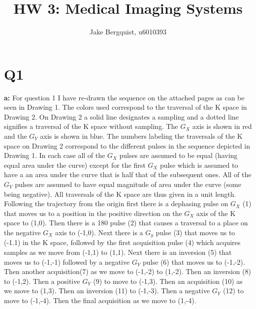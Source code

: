 \documentclass[12pt]{article}
\begin{document}
\title{HW 3: Medical Imaging Systems}
\author{Jake Bergquist, u6010393 }
\maketitle

\section{Q1}
\noindent\textbf{a: }
For question 1 I have re-drawn the sequence on the attached pages as can be seen in Drawing 1.  The colors used correspond to the traversal of the K space in Drawing 2. On Drawing 2 a solid line designates a sampling and a dotted line signifies a traversal of the K space without sampling. The $G_X$ axis is shown in red and the $G_Y$ axis is shown in blue. The numbers labeling the traversals of the K space on Drawing 2 correspond to the different pulses in the sequence depicted in Drawing 1. In each case all of the $G_X$ pulses are assumed to be equal (having equal area under the curve) except for the first $G_X$ pulse which is assumed to have a an area under the curve that is half that of the subsequent ones. All of the $G_Y$ pulses are assumed to have equal magnitude of area under the curve (some being negative). All traversals of the K space are thus given in a unit length. Following the trajectory from the origin first there is a dephasing pulse on $G_X$ (1) that moves us to a position in the positive direction on the $G_X$ axis of the K space to (1,0). Then there is a 180 pulse (2) that causes a traversal to a place on the negative $G_X$ axis to (-1,0). Next there is a $G_y$ pulse (3) that moves us to (-1.1) in the K space, followed by the first acquisition pulse (4) which acquires samples as we move from (-1,1) to (1,1). Next there is an inversion (5) that moves us to (-1,-1) followed by a negative $G_Y$ pulse (6) that moves us to (-1,-2). Then another acquisition(7) as we move to (-1,-2) to (1,-2). Then an inversion (8) to (-1,2). Then a positive $G_Y$ (9) to move to (-1,3). Then an acquisition (10) as we move to (1,3). Then an inversion (11) to (-1,-3). Then a negative $G_Y$ (12) to move to (-1,-4). Then the final acquisition as we move to (1,-4).
\end{document}
